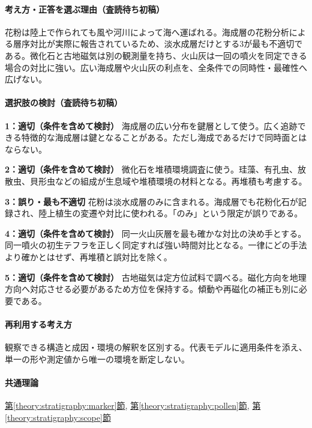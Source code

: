 \paragraph{考え方・正答を選ぶ理由（査読待ち初稿）} 花粉は陸上で作られても風や河川によって海へ運ばれる。海成層の花粉分析による層序対比が実際に報告されているため、淡水成層だけとする3が最も不適切である。微化石と古地磁気は別の観測量を持ち、火山灰は一回の噴火を同定できる場合の対比に強い。広い海成層や火山灰の利点を、全条件での同時性・最確性へ広げない。

\paragraph{選択肢の検討（査読待ち初稿）}\mbox{}\par

\noindent\textbf{1：適切（条件を含めて検討）} 海成層の広い分布を鍵層として使う。広く追跡できる特徴的な海成層は鍵となることがある。ただし海成であるだけで同時面とはならない。\par

\noindent\textbf{2：適切（条件を含めて検討）} 微化石を堆積環境調査に使う。珪藻、有孔虫、放散虫、貝形虫などの組成が生息域や堆積環境の材料となる。再堆積も考慮する。\par

\noindent\textbf{3：誤り・最も不適切} 花粉は淡水成層のみに含まれる。海成層でも花粉化石が記録され、陸上植生の変遷や対比に使われる。「のみ」という限定が誤りである。\par

\noindent\textbf{4：適切（条件を含めて検討）} 同一火山灰層を最も確かな対比の決め手とする。同一噴火の初生テフラを正しく同定すれば強い時間対比となる。一律にどの手法より確かとはせず、再堆積と誤対比を除く。\par

\noindent\textbf{5：適切（条件を含めて検討）} 古地磁気は定方位試料で調べる。磁化方向を地理方向へ対応させる必要があるため方位を保持する。傾動や再磁化の補正も別に必要である。\par

\paragraph{再利用する考え方} 観察できる構造と成因・環境の解釈を区別する。代表モデルに適用条件を添え、単一の形や測定値から唯一の環境を断定しない。

\paragraph{共通理論} \hyperref[theory:stratigraphy:marker]{第\ref*{theory:stratigraphy:marker}節}, \hyperref[theory:stratigraphy:pollen]{第\ref*{theory:stratigraphy:pollen}節}, \hyperref[theory:stratigraphy:scope]{第\ref*{theory:stratigraphy:scope}節}

